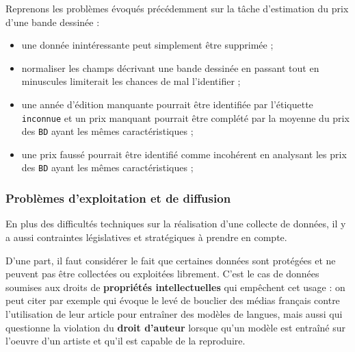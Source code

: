 			\begin{leftBarExamples}
				Reprenons les problèmes évoqués précédemment sur la tâche d'estimation du prix d'une bande dessinée :
				\begin{itemize}
					\item une donnée inintéressante peut simplement être supprimée ;
					\item normaliser les champs décrivant une bande dessinée en passant tout en minuscules limiterait les chances de mal l'identifier ;
					\item une année d'édition manquante pourrait être identifiée par l'étiquette \texttt{inconnue} et un prix manquant pourrait être complété par la moyenne du prix des \texttt{BD} ayant les mêmes caractéristiques ;
					\item une prix faussé pourrait être identifié comme incohérent en analysant les prix des \texttt{BD} ayant les mêmes caractéristiques ;
				\end{itemize}
			\end{leftBarExamples}
		
		
		\subsubsection{Problèmes d'exploitation et de diffusion}
		\label{section:2.3.1.C-DEFIS-ANNOTATION-ASPECT-DONNEES-DROITS}
		
			En plus des difficultés techniques sur la réalisation d'une collecte de données, il y a aussi contraintes législatives et stratégiques à prendre en compte.
			
			D'une part, il faut considérer le fait que certaines données sont protégées et ne peuvent pas être collectées ou exploitées librement.
			C'est le cas de données soumises aux droits de \textbf{propriétés intellectuelles} qui empêchent cet usage : on peut citer par exemple \cite{loignon:2023:ia-medias-francais} qui évoque le levé de bouclier des médias français contre l'utilisation de leur article pour entraîner des modèles de langues, mais aussi \cite{les-echos:2023:ia-auteur-game} qui questionne la violation du \textbf{droit d'auteur} lorsque qu'un modèle est entraîné sur l'oeuvre d'un artiste et qu'il est capable de la reproduire.
			
